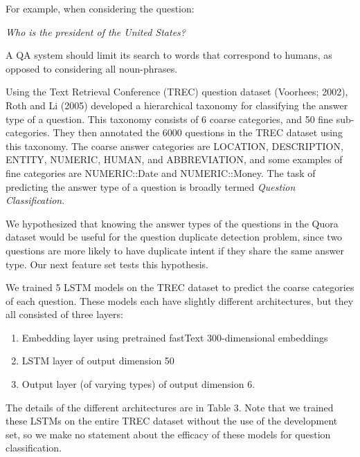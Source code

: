 \documentclass[letterpaper, 10 pt, conference]{ieeeconf}  %
\begin{document}
For example, when considering the question:
\begin{center}
\emph{Who is the president of the United States?}
\end{center}
A QA system should limit its search to words that correspond to humans, as opposed to considering all noun-phrases.

Using the Text Retrieval Conference (TREC) question dataset (Voorhees; 2002), Roth and Li (2005) developed a hierarchical taxonomy for classifying the answer type of a question. This taxonomy consists of 6 coarse categories, and 50 fine sub-categories. They then annotated the 6000 questions in the TREC dataset using this taxonomy. The coarse answer categories are LOCATION, DESCRIPTION, ENTITY, NUMERIC, HUMAN, and ABBREVIATION, and some examples of fine categories are NUMERIC::Date and NUMERIC::Money. The task of predicting the answer type of a question is broadly termed \emph{Question Classification}. 

We hypothesized that knowing the answer types of the questions in the Quora dataset would be useful for the question duplicate detection problem, since two questions are more likely to have duplicate intent if they share the same answer type. Our next feature set tests this hypothesis. 

We trained 5 LSTM models on the TREC dataset to predict the coarse categories of each question. These models each have slightly different architectures, but they all consisted of three layers:
\begin{enumerate}
\item Embedding layer using pretrained fastText 300-dimensional embeddings
\item LSTM layer of output dimension 50
\item Output layer (of varying types) of output dimension 6.
\end{enumerate}
The details of the different architectures are in Table 3. Note that we trained these LSTMs on the entire TREC dataset without the use of the development set,  so we make no statement about the efficacy of these models for question classification.
\end{document}
